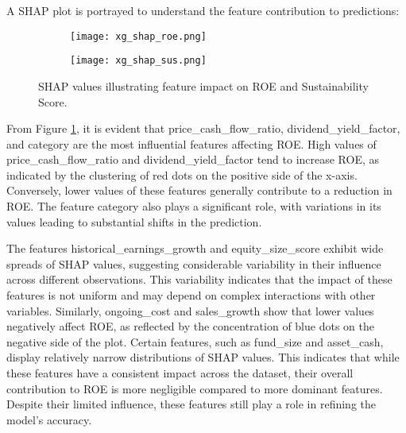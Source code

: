 A SHAP plot is portrayed to understand the feature contribution to predictions:

\begin{figure}[ht]
    \centering
    \begin{subfigure}{0.45\textwidth}
        \centering
        \texttt{[image: xg\_shap\_roe.png]}
        \label{fig:xg_shap_roe}
    \end{subfigure}
    \hfill
    \begin{subfigure}{0.45\textwidth}
        \centering
        \texttt{[image: xg\_shap\_sus.png]}
        \label{fig:xg_shap_sus}
    \end{subfigure}
    \caption{SHAP values illustrating feature impact on ROE and Sustainability Score.}
    \label{fig:xg_shap_plots}
\end{figure}

\noindent From Figure \ref{fig:xg_shap_roe}, it is evident that price\_cash\_flow\_ratio, dividend\_yield\_factor, and category are the most influential features affecting ROE. High values of price\_cash\_flow\_ratio and dividend\_yield\_factor tend to increase ROE, as indicated by the clustering of red dots on the positive side of the x-axis. Conversely, lower values of these features generally contribute to a reduction in ROE. The feature category also plays a significant role, with variations in its values leading to substantial shifts in the prediction.

The features historical\_earnings\_growth and equity\_size\_score exhibit wide spreads of SHAP values, suggesting considerable variability in their influence across different observations. This variability indicates that the impact of these features is not uniform and may depend on complex interactions with other variables. Similarly, ongoing\_cost and sales\_growth show that lower values negatively affect ROE, as reflected by the concentration of blue dots on the negative side of the plot. Certain features, such as fund\_size and asset\_cash, display relatively narrow distributions of SHAP values. This indicates that while these features have a consistent impact across the dataset, their overall contribution to ROE is more negligible compared to more dominant features. Despite their limited influence, these features still play a role in refining the model’s accuracy.

